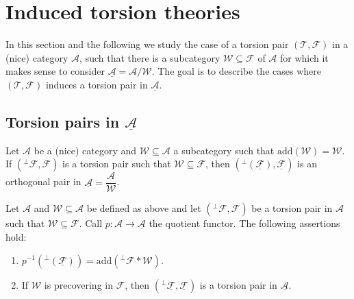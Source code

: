 \clearpage

\section{Induced torsion theories}

In this section and the following we study the case of a torsion pair $(\mathcal{T},\mathcal{F})$
in a (nice) category $\mathcal{A}$, such that there is a subcategory $\mathcal{W}\subseteq\mathcal{F}$
of $\mathcal{A}$ for which it makes sense to consider $\underline{\mathcal{A}}=\mathcal{A}/\mathcal{W}$. The goal is to
describe the cases where $(\mathcal{T},\mathcal{F})$ induces a torsion pair in $\underline{\mathcal{A}}$.

\subsection{Torsion pairs in $\underline{\mathcal{A}}$}

\begin{lemma}
  Let $\mathcal{A}$ be a (nice) category and $\mathcal{W}\subseteq\mathcal{A}$ a subcategory
  such that $\mathrm{add}(\mathcal{W})=\mathcal{W}$. If $(^\perp\mathcal{F},\mathcal{F})$ is a torsion pair
  such that $\mathcal{W}\subseteq \mathcal{F}$, then $(^\perp(\underline{\mathcal{F}}),\underline{\mathcal{F}})$
  is an orthogonal pair in $\underline{\mathcal{A}}=\dfrac{\mathcal{A}}{\mathcal{W}}$.
\end{lemma}

\begin{lemma}\label{lem:notes:3}
  Let $\mathcal{A}$ and $\mathcal{W}\subseteq\mathcal{A}$ be defined as above and let
  $(^\perp\mathcal{F},\mathcal{F})$ be a torsion pair in $\mathcal{A}$ such that $\mathcal{W}\subseteq\mathcal{F}$.
  Call $p:\mathcal{A}\to \underline{\mathcal{A}}$ the quotient functor.
  The following assertions hold:
  \begin{enumerate}
    \item $p^{-1}(^\perp(\underline{\mathcal{F}}))=\mathrm{add}(^\perp\mathcal{F}\ast\mathcal{W})$.
    \item If $\mathcal{W}$ is precovering in $\mathcal{F}$, then $(^\perp\underline{\mathcal{F}},\underline{\mathcal{F}})$
    is a torsion pair in $\underline{\mathcal{A}}$.
  \end{enumerate}
\end{lemma}

